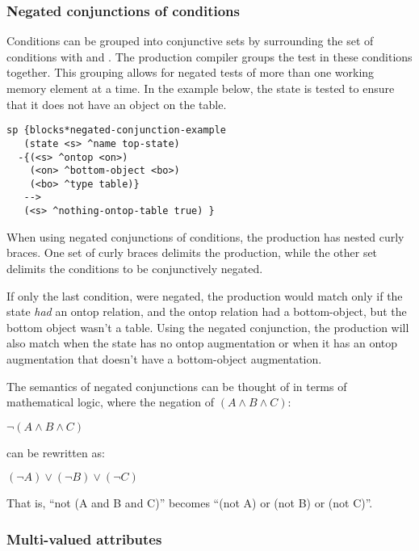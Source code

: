 \subsubsection{Negated conjunctions of conditions}
\label{SYNTAX-pm-lhs-negaconj}      %

Conditions can be grouped into conjunctive sets by surrounding the set of conditions with \soar{\{} and \soar{\}}. The production compiler groups the test in these conditions together. This grouping allows for negated tests of more than one working memory element at a time. In the example below, the state is tested to ensure that it does not have an object on the table. 

\begin{verbatim}
sp {blocks*negated-conjunction-example
   (state <s> ^name top-state)
  -{(<s> ^ontop <on>)
    (<on> ^bottom-object <bo>)
    (<bo> ^type table)}
   -->
   (<s> ^nothing-ontop-table true) } 
\end{verbatim}

When using negated conjunctions of conditions, the production has nested curly braces. One set of curly braces delimits the production, while the other set delimits the conditions to be conjunctively negated.

If only the last condition,  were negated, the production would match only if the state \emph{had} an ontop relation, and the ontop relation had a bottom-object, but the bottom object wasn't a table. Using the negated conjunction, the production will also match when the state has no ontop augmentation or when it has an ontop augmentation that doesn't have a bottom-object augmentation.

The semantics of negated conjunctions can be thought of in terms of mathematical logic, where the negation of $(A \wedge B \wedge C)$:

$\neg (A \wedge B \wedge C)$

can be rewritten as:

$(\neg A) \vee (\neg B) \vee (\neg C)$

That is, ``not (A and B and C)'' becomes ``(not A) or (not B) or (not C)''.



\subsubsection{Multi-valued attributes}
\label{SYNTAX-pm-lhs-multi}

